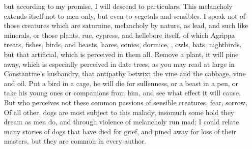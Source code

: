 
but according to my promise, I will descend to particulars. This melancholy
extends itself not to men only, but even to vegetals and sensibles. I speak not
of those creatures which are saturnine, melancholy by nature, as lead, and such
like minerals, or those plants, rue, cypress, \etc{} and hellebore itself, of
which Agrippa treats, fishes, birds, and beasts, hares,
conies, dormice, \etc{}, owls, bats, nightbirds, but that artificial, which is
perceived in them all. Remove a plant, it will pine away, which is especially
perceived in date trees, as you may read at large in Constantine's husbandry,
that antipathy betwixt the vine and the cabbage, vine and oil. Put a bird in a
cage, he will die for sullenness, or a beast in a pen, or take his young ones
or companions from him, and see what effect it will cause. But who perceives
not these common passions of sensible creatures, fear, sorrow, \etc{} Of all
other, dogs are most subject to this malady, insomuch some hold they dream as
men do, and through violence of melancholy run mad; I could relate many stories
of dogs that have died for grief, and pined away for loss of their masters, but
they are common in every author.

